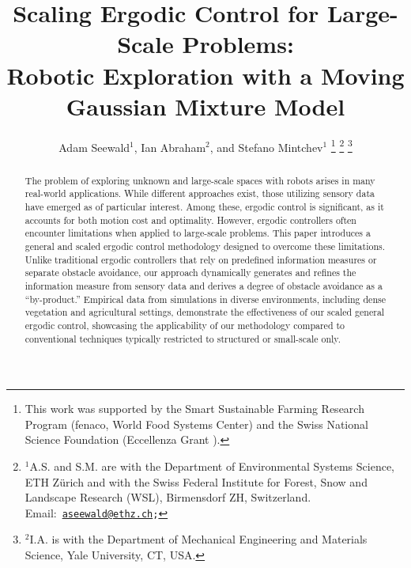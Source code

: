 \documentclass[letterpaper,10pt,conference,twoside]{IEEEtran}
\theoremstyle{definition}
\begin{document}

\title{\LARGE\bf Scaling Ergodic Control for Large-Scale Problems:\\Robotic Exploration with a Moving Gaussian Mixture Model}

\author{Adam Seewald${}^{\text{1}}$, Ian Abraham${}^{\text{2}}$, and Stefano Mintchev${}^{\text{1}}$
  \thanks{%
  This work was supported by the Smart Sustainable Farming Research Program (fenaco, World Food Systems Center) and the Swiss National Science Foundation (Eccellenza Grant ).}
  \thanks{${}^{\text{1}}$A.\hspace*{.4ex}S. and S.\hspace*{.4ex}M. are with the Department of Environmental Systems Science, ETH Z{\"u}rich and with the Swiss Federal Institute for Forest, Snow and Landscape Research (WSL), Birmensdorf ZH, Switzerland. Email:~{\tt\footnotesize \href{mailto:aseewald@ethz.ch}{aseewald@ethz.ch};}}
  \thanks{${}^{\text{2}}$I.\hspace*{.4ex}A. is with the Department of Mechanical Engineering and Materials Science, Yale University, CT, USA.}
}

\maketitle

\begin{abstract}
  The problem of exploring unknown and large-scale spaces with robots arises in many real-world applications. While different approaches exist, those utilizing sensory data have emerged as of particular interest. Among these, ergodic control is significant, as it accounts for both motion cost and optimality. However, ergodic controllers often encounter limitations when applied to large-scale problems. This paper introduces a general and scaled ergodic control methodology designed to overcome these limitations. Unlike traditional ergodic controllers that rely on predefined information measures or separate obstacle avoidance, our approach dynamically generates and refines the information measure from sensory data and derives a degree of obstacle avoidance as a ``by-product.'' Empirical data from simulations in diverse environments, including dense vegetation and agricultural settings, demonstrate the effectiveness of our scaled general ergodic control, showcasing the applicability of our methodology compared to conventional techniques typically restricted to structured or small-scale only.
\end{abstract}
\end{document}
